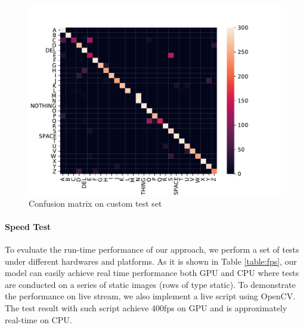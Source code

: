 \documentclass[10pt,twocolumn,letterpaper]{article}
\begin{document}
\begin{figure}[h]
\begin{center}
\includegraphics[width=1\linewidth]{imgs/confusion}
\end{center}
   \caption{Confusion matrix on custom test set}
\label{fig:confusion}
\end{figure}

\paragraph{Speed Test}
To evaluate the run-time performance of our approach, we perform a set of tests under different hardwares and platforms. As it is shown in Table \ref{table:fps}, our model can easily achieve real time performance both GPU and CPU where tests are conducted on a series of static images (rows of type static). To demonstrate the performance on live stream, we also implement a live script using OpenCV. The test result with such script achieve 400fps on GPU and is approximately real-time on CPU.  
\end{document}
